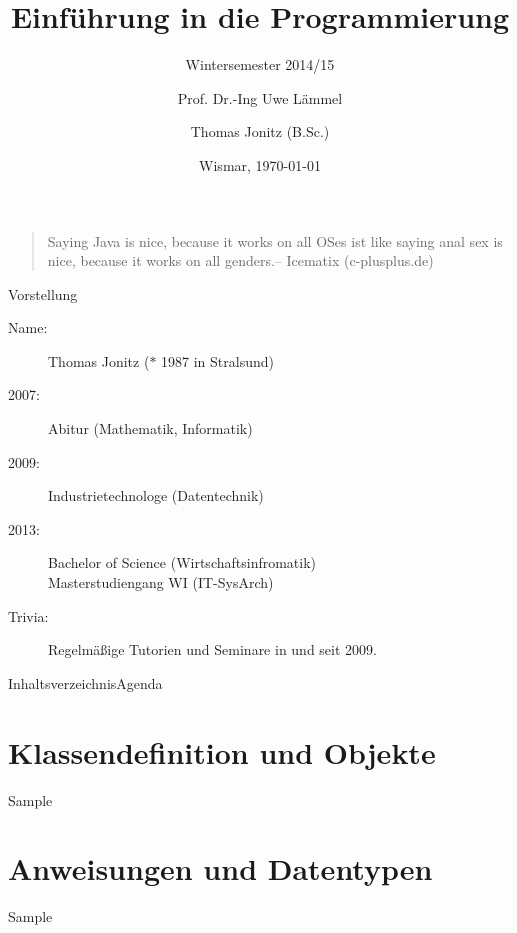 \documentclass{hswbeamer}
\title[EiP]{Einführung in die Programmierung}
\subtitle[WS 2014/15]{Wintersemester 2014/15}
\author[\Copyright{Uwe L\"{a}mmel, Thomas Jonitz}]{Prof. Dr.-Ing Uwe L\"{a}mmel \and Thomas Jonitz (B.Sc.)}
\date{Wismar, \today}
\begin{document}
\begin{frame}
    \begin{quote}
        \glqq Saying Java is nice, because it works on all OSes ist like saying anal sex is nice, because it works on all genders.\grqq -- Icematix (c-plusplus.de)
    \end{quote}
\end{frame}


\begin{frame}{Vorstellung}
    \begin{description}
    \item[Name:]Thomas Jonitz ($\ast$ 1987 in Stralsund)
    \item[2007:]Abitur (Mathematik, Informatik)
    \item[2009:]Industrietechnologe (Datentechnik)
    \item[2013:]Bachelor of Science (Wirtschaftsinfromatik)\\Masterstudiengang WI (IT-SysArch)
    \item[Trivia:]Regelmäßige Tutorien und Seminare in  und  seit 2009.
    \end{description}   
\end{frame}

\begin{frame}
    \maketitle
\end{frame}

\begin{frame}{Inhaltsverzeichnis}{Agenda}
    \tableofcontents
\end{frame}



\section{Klassendefinition und Objekte}
\begin{frame}{Sample}
\end{frame}

\section{Anweisungen und Datentypen}
\begin{frame}{Sample}
\end{frame}
\end{document}

